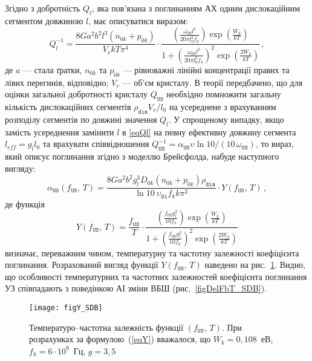 Згідно з \cite{Brailsford} добротність $Q_l$, яка пов'язана з поглинанням АХ одним дислокаційним сегментом довжиною $l$, має описуватися виразом:
\begin{equation}
\label{eqQl}
Q_l^{-1}=\frac{8Ga^2b^2l^3(n_{0k}+p_{0k})}{V_vkT\pi^4}\cdot
\frac{\left(\frac{\omega_\mathtt{US} l^2}{20\pi l_0^2f_k}\right)\exp{\left(\frac{W_k}{kT}\right)}}
{1+\left(\frac{\omega_\mathtt{US} l^2}{20\pi l_0^2f_k}\right)^2\exp{\left(\frac{2W_k}{kT}\right)}}\,,
\end{equation}
де $a$ --- стала ґратки,
$n_{0k}$ та $p_{0k}$ --- рівноважні лінійні концентрації правих та лівих перегинів, відповідно;
$V_v$ --- об'єм кристалу.
В теорії передбачено, що для оцінки загальної добротності кристалу $Q_\mathtt{US}$ необхідно
помножити загальну кількість дислокаційних сегментів $\rho_\mathtt{dis}V_v/l_0$
на усереднене з врахуванням розподілу сегментів по довжині значення $Q_l$.
У спрощеному випадку, якщо замість усереднення замінити $l$ в \ref{eqQl}
на певну ефективну довжину сегмента \mbox{$l_{eff} = g_l l_0$} та врахувати співвідношення $Q_\mathtt{US}^{-1} = \alpha_\mathtt{US}\upsilon\ln{10}/(10 \,\omega_\mathtt{US})$, то вираз, який описує поглинання згідно з моделлю Брейсфолда, набуде наступного вигляду:
\begin{equation}
\label{eqAlpaBr}
\alpha_\mathtt{US}(f_\mathtt{US},\,T)=\frac{8Ga^2b^2g_l^3D_{0k}(n_{0k}+p_{0k})\rho_\mathtt{dis}}{\ln{10}\:\upsilon_\mathtt{Si} f_k k\pi^2}\cdot Y(f_\mathtt{US},\,T)\,,
\end{equation}
де функція
\begin{equation}
\label{eqY}
Y(f_\mathtt{US},\,T)=\frac{f_\mathtt{US}}{T}\cdot\frac{\left(\frac{f_\mathtt{US} g_l^2}{10 f_k}\right)\exp{\left(\frac{W_k}{kT}\right)}}
{1+\left(\frac{f_\mathtt{US} g_l^2}{10 f_k}\right)^2\exp{\left(\frac{2W_k}{kT}\right)}}
\end{equation}
визначає, переважним чином, температурну та частотну залежності коефіцієнта поглинання.
Розрахований вигляд функції $Y(f_\mathtt{US},\,T)$ наведено на рис.~\ref{figY_SDB}.
Видно, що особливості температурних та частотних залежностей коефіцієнта поглинання УЗ співпадають
з поведінкою АІ зміни ВБШ (рис.~\ref{figDelFbT_SDB}).


\begin{figure}
\center
\texttt{[image: figY\_SDB]}
\caption{\label{figY_SDB}
Температуро--частотна залежність функції $(f_\mathtt{US},\,T)$.
При розрахунках за формулою~(\ref{eqY}) вважалося, що
$W_k=0,108$~еВ, $f_k=6\cdot10^9$~Гц, $g=3,5$
}%
\end{figure}

